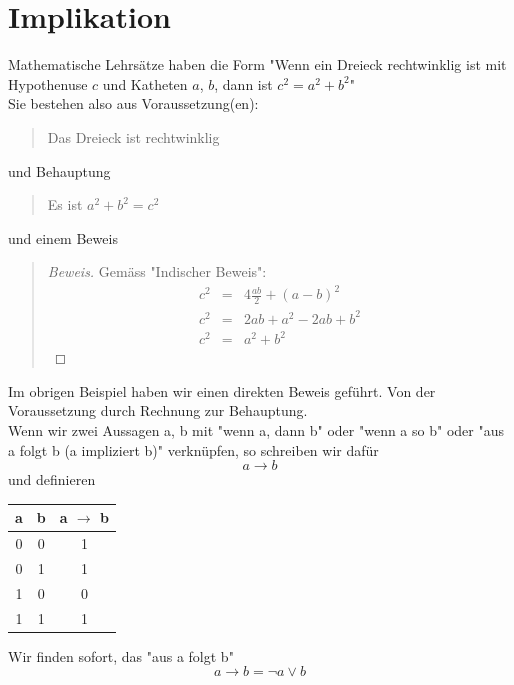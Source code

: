 \documentclass{report}
\begin{document}
\section{Implikation}
Mathematische Lehrsätze haben die Form "Wenn ein Dreieck rechtwinklig ist mit Hypothenuse $c$ und Katheten $a$, $b$, dann ist $c^2=a^2+b^2$"\\
Sie bestehen also aus Voraussetzung(en):
\begin{quote}Das Dreieck ist rechtwinklig\end{quote}
und Behauptung
\begin{quote}Es ist $a^2+b^2=c^2$\end{quote}
und einem Beweis
\begin{quote}\begin{proof}[Beweis] Gemäss "Indischer Beweis":
\begin{eqnarray}c^2&=&4\frac{ab}{2}+(a-b)^2 \nonumber \\
c^2&=&2ab+a^2-2ab+b^2\nonumber \\
c^2&=&a^2+b^2\end{eqnarray}\end{proof}\end{quote}
Im obrigen Beispiel haben wir einen direkten Beweis geführt. Von der Voraussetzung durch Rechnung zur Behauptung.\\
Wenn wir zwei Aussagen a, b mit "wenn a, dann b" oder "wenn a so b" oder "aus a folgt b (a impliziert b)" verknüpfen, so schreiben wir dafür
\begin{equation}a \to b\end{equation}
und definieren
\begin{center}\begin{tabular}{c c | c}
a & b & a \(\to\) b\\
\hline
0 & 0 & 1  \\
0 & 1 & 1  \\
1 & 0 & 0 \\
1 & 1 & 1 \\
\end{tabular}\end{center}
Wir finden sofort, das "aus a folgt b"
\begin{equation}a \to b = \lnot a \lor b\end{equation}
\end{document}
